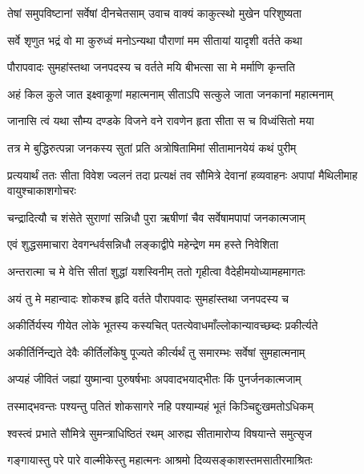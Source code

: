 
\twolineshloka
{तेषां समुपविष्टानां सर्वेषां दीनचेतसाम्}
{उवाच वाक्यं काकुत्स्थो मुखेन परिशुष्यता} %

\twolineshloka
{सर्वे शृणुत भद्रं वो मा कुरुध्वं मनोऽन्यथा}
{पौराणां मम सीतायां यादृशी वर्तते कथा} %

\twolineshloka
{पौरापवादः सुमहांस्तथा जनपदस्य च}
{वर्तते मयि बीभत्सा सा मे मर्माणि कृन्तति} %

\twolineshloka
{अहं किल कुले जात इक्ष्वाकूणां महात्मनाम्}
{सीताऽपि सत्कुले जाता जनकानां महात्मनाम्} %

\twolineshloka
{जानासि त्वं यथा सौम्य दण्डके विजने वने}
{रावणेन हृता सीता स च विध्वंसितो मया} %

\twolineshloka
{तत्र मे बुद्धिरुत्पन्ना जनकस्य सुतां प्रति}
{अत्रोषितामिमां सीतामानयेयं कथं पुरीम्} %

\threelineshloka
{प्रत्ययार्थं ततः सीता विवेश ज्वलनं तदा}
{प्रत्यक्षं तव सौमित्रे देवानां हव्यवाहनः}
{अपापां मैथिलीमाह वायुश्चाकाशगोचरः} %

\twolineshloka
{चन्द्रादित्यौ च शंसेते सुराणां सन्निधौ पुरा}
{ऋषीणां चैव सर्वेषामपापां जनकात्मजाम्} %

\twolineshloka
{एवं शुद्धसमाचारा देवगन्धर्वसन्निधौ}
{लङ्काद्वीपे महेन्द्रेण मम हस्ते निवेशिता} %

\twolineshloka
{अन्तरात्मा च मे वेत्ति सीतां शुद्धां यशस्विनीम्}
{ततो गृहीत्वा वैदेहीमयोध्यामहमागतः} %

\twolineshloka
{अयं तु मे महान्वादः शोकश्च हृदि वर्तते}
{पौरापवादः सुमहांस्तथा जनपदस्य च} %

\twolineshloka
{अकीर्तिर्यस्य गीयेत लोके भूतस्य कस्यचित्}
{पतत्येवाधमाँल्लोकान्यावच्छब्दः प्रकीर्त्यते} %

\twolineshloka
{अकीर्तिर्निन्द्यते देवैः कीर्तिर्लोकेषु पूज्यते}
{कीर्त्यर्थं तु समारम्भः सर्वेषां सुमहात्मनाम्} %

\twolineshloka
{अप्यहं जीवितं जह्यां युष्मान्वा पुरुषर्षभाः}
{अपवादभयाद्भीतः किं पुनर्जनकात्मजाम्} %

\twolineshloka
{तस्माद्भवन्तः पश्यन्तु पतितं शोकसागरे}
{नहि पश्याम्यहं भूतं किञ्चिद्दुःखमतोऽधिकम्} %

\twolineshloka
{श्वस्त्वं प्रभाते सौमित्रे सुमन्त्राधिष्ठितं रथम्}
{आरुह्य सीतामारोप्य विषयान्ते समुत्सृज} %

\twolineshloka
{गङ्गायास्तु परे पारे वाल्मीकेस्तु महात्मनः}
{आश्रमो दिव्यसङ्काशस्तमसातीरमाश्रितः} %

